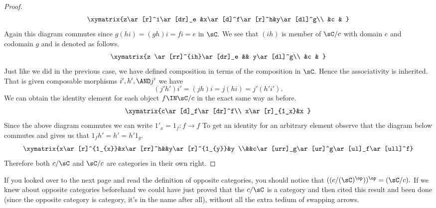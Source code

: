 \documentclass[../../main]{subfiles}
\begin{document}
\begin{proof}
	\[\xymatrix{z\ar[r]^i\ar[dr]_e &x\ar[d]^f\ar[r]^h&y\ar[dl]^g\\ &c & }\]
	Again this diagram commutes since \(g(hi)=(gh)i=fi=e\) in \(\sC.\)
	We see that \((ih)\) is member of \(\sC/c\) with domain \(e\) and
	codomain \(g\) and is denoted as follows.
	\[\xymatrix{z \ar[rr]^{ih}\ar[dr]_e && y\ar[dl]^g\\ &c & }\]
	Just like we did in the previous case, we have defined composition in
	terms of the composition in \(\sC.\) Hence the associativity is
	inherited. That is given composable morphisms \(i',h',\AND j'\) we have
	\[(j'h')i'=(jh)i=j(hi)=j'(h'i').\]
	We can obtain the identity element for each object \(f\IN \sC/c\) in the
	exact same way as before.
	\[\xymatrix{c\ar[d]_f\ar[dr]^f\\ x\ar[r]_{1_x}&x }\]
	Since the above diagram commutes we can write \(1'_x=1_{f}:f\to f\) To
	get an identity for an arbitrary element observe that the diagram below
	commutes and gives us that \(1_{f}h'=h'=h'1_{g}\).
	\[\xymatrix{x\ar[r]^{1_{x}}&x\ar[rr]^h&&y\ar[r]^{1_{y}}&y
							 \\&&c\ar[urr]_g\ar[ur]^g\ar[ul]_f\ar[ull]^f}\]
	Therefore both \(c/\sC\) and \(\sC/c\) are categories in their own right.
\end{proof}

If you looked over to the next page and read the definition of opposite
categories, you should notice that \(((c/(\sC)^{\op}))^{\op}=(\sC/c).\)
If we knew about opposite categories beforehand we could have just
proved that the \(c/\sC\) is a category and then cited this result and
been done (since the opposite category is category, it's in the name
after all), without all the extra tedium of swapping arrows.
\end{document}
